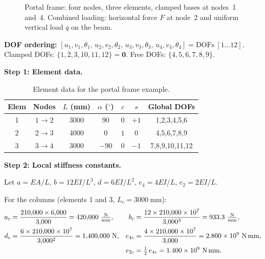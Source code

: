 \begin{example}
\begin{figure}[htbp]
\caption{Portal frame: four nodes, three elements, clamped bases at
nodes~1 and~4. Combined loading: horizontal force $F$ at node~2 and
uniform vertical load $q$ on the beam.}
\label{fig:frame_portal}
\end{figure}

\medskip
\noindent\textbf{DOF ordering:}
$[u_1,v_1,\theta_1,\,u_2,v_2,\theta_2,\,u_3,v_3,\theta_3,\,u_4,v_4,\theta_4]
= \text{DOFs}\ [1\ldots12]$.\\
Clamped DOFs: $\{1,2,3,10,11,12\}=\mathbf{0}$.
Free DOFs: $\{4,5,6,7,8,9\}$.

\medskip
\noindent\textbf{Step 1: Element data.}

\begin{table}[htbp]
\centering
\small
\caption{Element data for the portal frame example.}
\label{tab:frame_elements}
\begin{tabular}{@{}ccccccc@{}}
\toprule
Elem & Nodes & $L$ (mm) & $\alpha$ ($^\circ$) & $c$ & $s$ & Global DOFs \\
\midrule
1 & $1\to2$ & 3000 &  90 & $0$ & $+1$ & 1,2,3,4,5,6 \\
2 & $2\to3$ & 4000 &   0 & $1$ & $0$  & 4,5,6,7,8,9 \\
3 & $3\to4$ & 3000 & $-90$ & $0$ & $-1$ & 7,8,9,10,11,12 \\
\bottomrule
\end{tabular}
\end{table}

\medskip
\noindent\textbf{Step 2: Local stiffness constants.}

Let $a=EA/L$, $b=12EI/L^3$, $d=6EI/L^2$, $e_4=4EI/L$, $e_2=2EI/L$.

\smallskip
For the columns (elements 1 and 3, $L_c = 3000\ \text{mm}$):
\begin{align*}
  a_c &= \frac{210{,}000 \times 6{,}000}{3{,}000} = 420{,}000\ \tfrac{\text{N}}{\text{mm}},
  &b_c &= \frac{12 \times 210{,}000 \times 10^7}{3{,}000^3} = 933.3\ \tfrac{\text{N}}{\text{mm}},\\
  d_c &= \frac{6 \times 210{,}000 \times 10^7}{3{,}000^2} = 1{,}400{,}000\ \text{N},
  &e_{4c} &= \frac{4 \times 210{,}000 \times 10^7}{3{,}000} = 2.800\times10^9\ \text{N\,mm},\\
  &&e_{2c} &= \tfrac{1}{2}\,e_{4c} = 1.400\times10^9\ \text{N\,mm}.
\end{align*}


\end{example}
